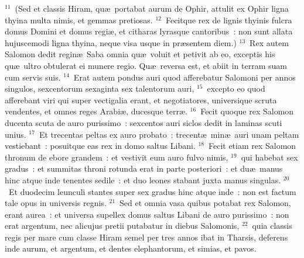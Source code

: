 ${}^{11}$~(Sed et classis Hiram, qu\ae\ portabat aurum de Ophir, attulit ex Ophir ligna thyina multa nimis, et gemmas pretiosas.
${}^{12}$~Fecitque rex de lignis thyinis fulcra domus Domini et domus regi\ae , et citharas lyrasque cantoribus~: non sunt allata hujuscemodi ligna thyina, neque visa usque in pr\ae sentem diem.)
${}^{13}$~Rex autem Salomon dedit regin\ae\ Saba omnia qu\ae\ voluit et petivit ab eo, exceptis his qu\ae\ ultro obtulerat ei munere regio. Qu\ae\ reversa est, et abiit in terram suam cum servis suis.
${}^{14}$~Erat autem pondus auri quod afferebatur Salomoni per annos singulos, sexcentorum sexaginta sex talentorum auri,
${}^{15}$~excepto eo quod afferebant viri qui super vectigalia erant, et negotiatores, universique scruta vendentes, et omnes reges Arabi\ae , ducesque terr\ae .
${}^{16}$~Fecit quoque rex Salomon ducenta scuta de auro purissimo~: sexcentos auri siclos dedit in laminas scuti unius.
${}^{17}$~Et trecentas peltas ex auro probato~: trecent\ae\ min\ae\ auri unam peltam vestiebant~: posuitque eas rex in domo saltus Libani.
${}^{18}$~Fecit etiam rex Salomon thronum de ebore grandem~: et vestivit eum auro fulvo nimis,
${}^{19}$~qui habebat sex gradus~: et summitas throni rotunda erat in parte posteriori~: et du\ae\ manus hinc atque inde tenentes sedile~: et duo leones stabant juxta manus singulas.
${}^{20}$~Et duodecim leunculi stantes super sex gradus hinc atque inde~: non est factum tale opus in universis regnis.
${}^{21}$~Sed et omnia vasa quibus potabat rex Salomon, erant aurea~: et universa supellex domus saltus Libani de auro purissimo~: non erat argentum, nec alicujus pretii putabatur in diebus Salomonis,
${}^{22}$~quia classis regis per mare cum classe Hiram semel per tres annos ibat in Tharsis, deferens inde aurum, et argentum, et dentes elephantorum, et simias, et pavos.



